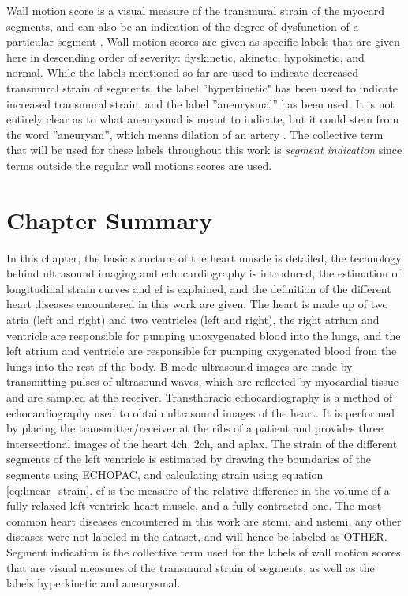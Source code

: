 Wall motion score is a visual measure of the transmural strain of the myocard segments, and can also be an indication of the degree of dysfunction of a particular segment \cite{strain_rate_imaging}. Wall motion scores are given as specific labels that are given here in descending order of severity: dyskinetic, akinetic, hypokinetic, and normal. While the labels mentioned so far are used to indicate decreased transmural strain of segments, the label ''hyperkinetic" has been used to indicate increased transmural strain, and the label ''aneurysmal'' has been used. It is not entirely clear as to what aneurysmal is meant to indicate, but it could stem from the word ''aneurysm'', which means dilation of an artery \cite{medic_net_aneurysm}. The collective term that will be used for these labels throughout this work is \textit{segment indication} since terms outside the regular wall motions scores are used.

\section{Chapter Summary}

In this chapter, the basic structure of the heart muscle is detailed, the technology behind ultrasound imaging and echocardiography is introduced, the estimation of longitudinal strain curves and \acrshort{ef} is explained, and the definition of the different heart diseases encountered in this work are given. The heart is made up of two atria (left and right) and two ventricles (left and right), the right atrium and ventricle are responsible for pumping unoxygenated blood into the lungs, and the left atrium and ventricle are responsible for pumping oxygenated blood from the lungs into the rest of the body. B-mode ultrasound images are made by transmitting pulses of ultrasound waves, which are reflected by myocardial tissue and are sampled at the receiver. Transthoracic echocardiography is a method of echocardiography used to obtain ultrasound images of the heart. It is performed by placing the transmitter/receiver at the ribs of a patient and provides three intersectional images of the heart \acrshort{4ch}, \acrshort{2ch}, and \acrshort{aplax}. The strain of the different segments of the left ventricle is estimated by drawing the boundaries of the segments using ECHOPAC, and calculating strain using equation \eqref{eq:linear_strain}. \acrshort{ef} is the measure of the relative difference in the volume of a fully relaxed left ventricle heart muscle, and a fully contracted one. The most common heart diseases encountered in this work are \acrshort{stemi}, and \acrshort{nstemi}, any other diseases were not labeled in the dataset, and will hence be labeled as OTHER. Segment indication is the collective term used for the labels of wall motion scores that are visual measures of the transmural strain of segments, as well as the labels hyperkinetic and aneurysmal.